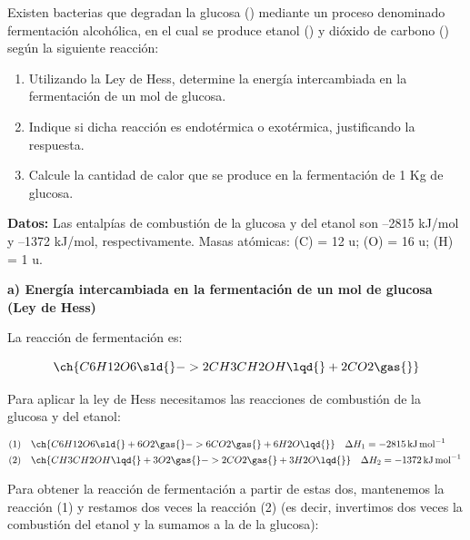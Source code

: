 \begin{exerciseEVAU}
    Existen bacterias que degradan la glucosa () mediante un proceso denominado fermentación
    alcohólica, en el cual se produce etanol () y dióxido de carbono () según la siguiente
    reacción:
    \begin{centeredequation}
    \end{centeredequation}
    \begin{enumerate}[label=\letraminuscula]
    \item Utilizando la Ley de Hess, determine la energía intercambiada en la fermentación de un mol
    de glucosa.
    \item Indique si dicha reacción es endotérmica o exotérmica, justificando la respuesta.
    \item Calcule la cantidad de calor que se produce en la fermentación de 1 Kg de glucosa.
    \end{enumerate}
    \textbf{Datos:}  Las entalpías de combustión de la glucosa y del etanol son –2815 kJ/mol y –1372 kJ/mol,
    respectivamente. Masas atómicas: (C) = 12 u; (O) = 16 u; (H) = 1 u.

    \begin{solu}

        \textbf{a) Energía intercambiada en la fermentación de un mol de glucosa (Ley de Hess)}

        La reacción de fermentación es:

        \begin{equation*}
            \ch{C6H12O6 \sld{} -> 2 CH3CH2OH \lqd{} + 2 CO2 \gas{}}
        \end{equation*}

        Para aplicar la ley de Hess necesitamos las reacciones de combustión de la glucosa y del etanol:

        \begin{align*}
            \text{(1)} \quad & \ch{C6H12O6 \sld{} + 6 O2 \gas{} -> 6 CO2 \gas{} + 6 H2O \lqd{}} \quad \Delta H_1 = \energia[kjmol]{-2815} \\
            \text{(2)} \quad & \ch{CH3CH2OH \lqd{} + 3 O2 \gas{} -> 2 CO2 \gas{} + 3 H2O \lqd{}} \quad \Delta H_2 = \energia[kjmol]{-1372}
        \end{align*}

        Para obtener la reacción de fermentación a partir de estas dos, mantenemos la reacción (1) y restamos dos veces la reacción (2) (es decir, invertimos dos veces la combustión del etanol y la sumamos a la de la glucosa):


\end{solu}
\end{exerciseEVAU}
